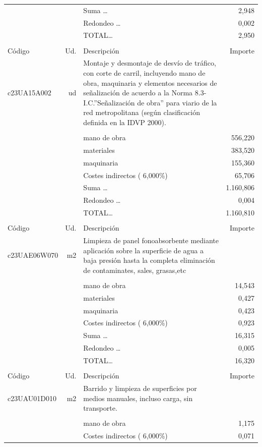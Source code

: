 \begin{supertabular}{l r p{60mm} r}
&&Suma \ldots&     2,948\\%
&&Redondeo \ldots&     0,002\\%
%
&&TOTAL\ldots&     2,950\\%
&&&\\%
Código&Ud.&Descripción&Importe\\%
\hline%
c23UA15A002&ud&Montaje y desmontaje de desvío de tráfico, con corte de carril, incluyendo mano de obra, maquinaria y elementos necesarios de señalización de acuerdo a la Norma 8.3{-}I.C.”Señalización de obra” para viario de la red metropolitana (según clasificación definida en la IDVP 2000).&\\%
&&&\\%
&&mano de obra&   556,220\\%
&&materiales&   383,520\\%
&&maquinaria&   155,360\\%
&&Costes indirectos (     6,000\%)&    65,706\\%
&&Suma \ldots& 1.160,806\\%
&&Redondeo \ldots&     0,004\\%
%
&&TOTAL\ldots& 1.160,810\\%
&&&\\%
Código&Ud.&Descripción&Importe\\%
\hline%
c23UAE06W070&m2&Limpieza de panel fonoabsorbente mediante aplicación sobre la superficie de agua a baja presión hasta la completa eliminación de contaminates, sales, grasas,etc &\\%
&&&\\%
&&mano de obra&    14,543\\%
&&materiales&     0,427\\%
&&maquinaria&     0,423\\%
&&Costes indirectos (     6,000\%)&     0,923\\%
&&Suma \ldots&    16,315\\%
&&Redondeo \ldots&     0,005\\%
%
&&TOTAL\ldots&    16,320\\%
&&&\\%
Código&Ud.&Descripción&Importe\\%
\hline%
c23UAU01D010&m2&Barrido y limpieza de superficies por medios manuales, incluso carga, sin transporte.&\\%
&&&\\%
&&mano de obra&     1,175\\%
&&Costes indirectos (     6,000\%)&     0,071\\%

\end{supertabular}

